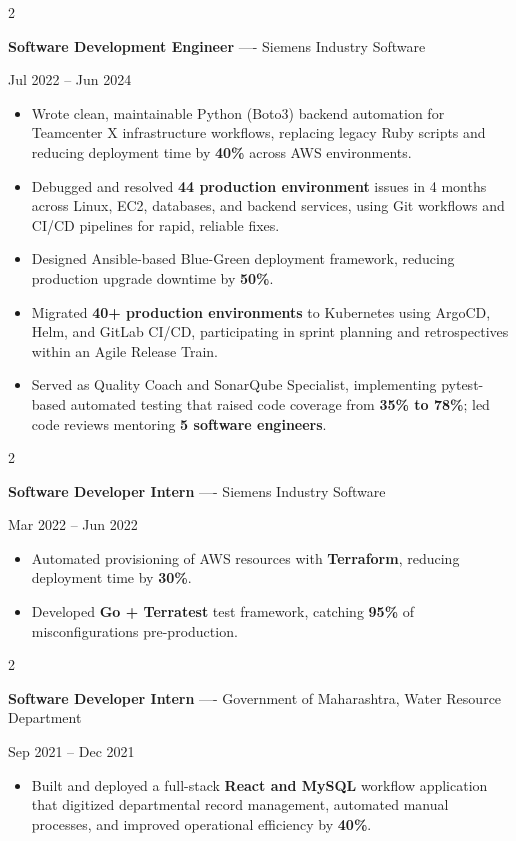 \documentclass[10pt, letterpaper]{article}
\newenvironment{highlights}{
    \begin{itemize}[
        topsep=0.10 cm,
        parsep=0.06 cm,
        partopsep=0pt,
        itemsep=0.06 cm,
        leftmargin=12pt
    ]
}{
    \end{itemize}
}
\newenvironment{twocolentry}[2][]{
    \onecolentry
    \def\secondColumn{#2}
    \setcolumnwidth{\fill, 4.5 cm}
    \begin{paracol}{2}
}{
    \switchcolumn \raggedleft \secondColumn
    \end{paracol}
    \endonecolentry
}
\begin{document}
\vspace{0.15 cm}

\begin{twocolentry}{Jul 2022 -- Jun 2024}
\textbf{Software Development Engineer} ---- Siemens Industry Software
\end{twocolentry}
\begin{highlights}
  \item Wrote clean, maintainable Python (Boto3) backend automation for Teamcenter X infrastructure workflows, replacing legacy Ruby scripts and reducing deployment time by \textbf{40\%} across AWS environments.
  \item Debugged and resolved \textbf{44 production environment} issues in 4 months across Linux, EC2, databases, and backend services, using Git workflows and CI/CD pipelines for rapid, reliable fixes.
  \item Designed Ansible-based Blue-Green deployment framework, reducing production upgrade downtime by \textbf{50\%}.
  \item Migrated \textbf{40+ production environments} to Kubernetes using ArgoCD, Helm, and GitLab CI/CD, participating in sprint planning and retrospectives within an Agile Release Train.
  \item Served as Quality Coach and SonarQube Specialist, implementing pytest-based automated testing that raised code coverage from \textbf{35\% to 78\%}; led code reviews mentoring \textbf{5 software engineers}.
\end{highlights}

\vspace{0.15 cm}

\begin{twocolentry}{Mar 2022 -- Jun 2022}
\textbf{Software Developer Intern} ---- Siemens Industry Software
\end{twocolentry}
\begin{highlights}
  \item Automated provisioning of AWS resources with \textbf{Terraform}, reducing deployment time by \textbf{30\%}.
  \item Developed \textbf{Go + Terratest} test framework, catching \textbf{95\%} of misconfigurations pre-production.
\end{highlights}

\vspace{0.15 cm}

\begin{twocolentry}{Sep 2021 -- Dec 2021}
\textbf{Software Developer Intern} ---- Government of Maharashtra, Water Resource Department
\end{twocolentry}
\begin{highlights}
  \item Built and deployed a full-stack \textbf{React and MySQL} workflow application that digitized departmental record management, automated manual processes, and improved operational efficiency by \textbf{40\%}.
\end{highlights}
\end{document}
